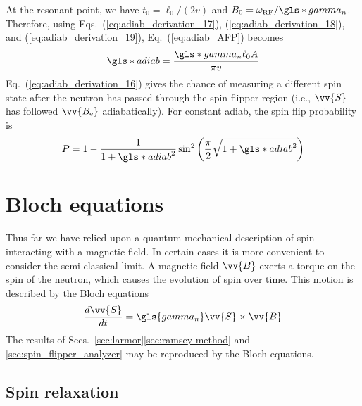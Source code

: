 %
At the resonant point, we have $t_0=\ell_0/(2v)$ and $B_0=\omega_\text{RF}/\gls*{gamma_n}$. Therefore, using Eqs.~(\ref{eq:adiab_derivation_17}), (\ref{eq:adiab_derivation_18}), and (\ref{eq:adiab_derivation_19}), Eq.~(\ref{eq:adiab_AFP}) becomes
%
\begin{gather}
    \gls*{adiab} = \frac{\gls*{gamma_n} \ell_0 A}{\pi v}
\end{gather}
%
Eq.~(\ref{eq:adiab_derivation_16}) gives the chance of measuring a different spin state after the neutron has passed through the spin flipper region (i.e., $\vv{S}$ has followed $\vv{B_\text{e}}$ adiabatically). For constant \gls*{adiab}, the spin flip probability is
%
\begin{gather}
    P=1-\frac{1}{1+\gls*{adiab}^{2}}\sin^{2}\left(\frac{\pi}{2}\sqrt{1+\gls*{adiab}^{2}}\right)
\end{gather}


\section{Bloch equations}\label{sec:bloch_equations}


Thus far we have relied upon a quantum mechanical description of spin interacting with a magnetic field. In certain cases it is more convenient to consider the semi-classical limit. A magnetic field $\vv{B}$ exerts a torque on the spin of the neutron, which causes the evolution of spin over time. This motion is described by the Bloch equations
%
\begin{gather}
    \frac{d\vv{S}}{dt}=\gls{gamma_n}\vv{S}\times \vv{B}
    \label{eq:bloch_equations}
\end{gather}
%
The results of Secs.~\ref{sec:larmor}\textendash \ref{sec:ramsey-method} and \ref{sec:spin_flipper_analyzer} may be reproduced by the Bloch equations.


\subsection{Spin relaxation}\label{sec:spin_relaxation}


